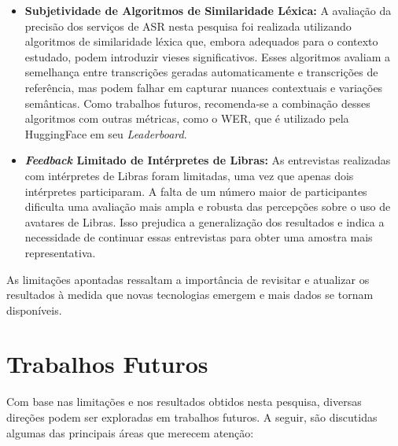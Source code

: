 \begin{itemize}
\item \textbf{Subjetividade de Algoritmos de Similaridade Léxica:} A avaliação da precisão dos serviços de ASR nesta pesquisa foi realizada utilizando algoritmos de similaridade léxica que, embora adequados para o contexto estudado, podem introduzir vieses significativos. Esses algoritmos avaliam a semelhança entre transcrições geradas automaticamente e transcrições de referência, mas podem falhar em capturar nuances contextuais e variações semânticas. Como trabalhos futuros, recomenda-se a combinação desses algoritmos com outras métricas, como o WER, que é utilizado pela HuggingFace em seu \textit{Leaderboard}.

\item \textbf{\textit{Feedback} Limitado de Intérpretes de Libras:} As entrevistas realizadas com intérpretes de Libras foram limitadas, uma vez que apenas dois intérpretes participaram. A falta de um número maior de participantes dificulta uma avaliação mais ampla e robusta das percepções sobre o uso de avatares de Libras. Isso prejudica a generalização dos resultados e indica a necessidade de continuar essas entrevistas para obter uma amostra mais representativa.

\end{itemize}

As limitações apontadas ressaltam a importância de revisitar e atualizar os resultados à medida que novas tecnologias emergem e mais dados se tornam disponíveis.

\section{Trabalhos Futuros}

Com base nas limitações e nos resultados obtidos nesta pesquisa, diversas direções podem ser exploradas em trabalhos futuros. A seguir, são discutidas algumas das principais áreas que merecem atenção:

